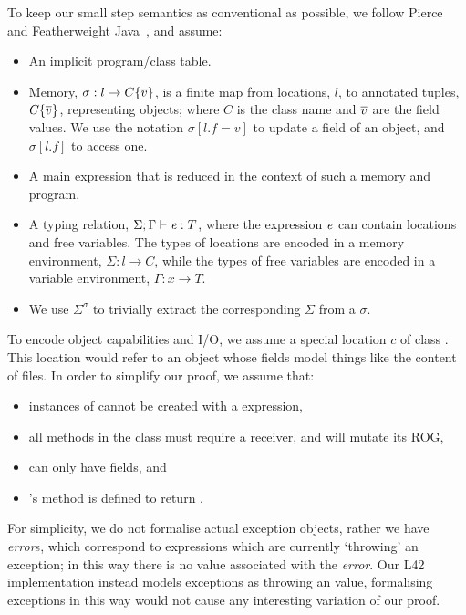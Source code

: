 To keep our small step semantics as conventional as possible, we follow Pierce~\cite{pierce2002types} and Featherweight Java~\cite{IgarashiEtAl01}, and assume:
\begin{itemize}
	\item An implicit program/class table.
	\item Memory, $\sigma : l\rightarrow C\{\hspace{0.03ex} \overline{\hspace{-0.03ex}v\hspace{-0.03ex}} \hspace{0.03ex}\}${, is} a finite map from locations, $l$, to annotated tuples, $C\{\hspace{0.03ex} \overline{\hspace{-0.03ex}v\hspace{-0.03ex}} \hspace{0.03ex}\}$, representing objects; where $C$ is the class name and $\hspace{0.03ex} \overline{\hspace{-0.03ex}v\hspace{-0.03ex}} \hspace{0.03ex}$ are the field values.
	We use the notation $\sigma[l.f=v]$ to update a field of an object, and $\sigma[l.f]$ to access one.
	\item A main expression that is reduced in the context of such a memory and program.
	\item A typing relation, $\Sigma;\Gamma\vdash{\ensuremath{\mathit{e}}}:T$, where 
	the expression ${\mathit{e}}$ can contain locations and free variables. The types of locations are encoded in 
a memory environment, 
$\Sigma : l\rightarrow C$,
	while the types of free variables are encoded in
a variable environment, $\Gamma : x\rightarrow T$.
	\item We use $\Sigma^\sigma$ to trivially extract the corresponding $\Sigma$ from a $\sigma$.
\end{itemize}
To encode object capabilities and I/O, we assume a special location  $c$ of class \Q@Cap@. This location would refer to an object whose fields model things like the content of files. In order to simplify our proof, we assume that:
\begin{itemize}
	\item instances of \Q@Cap@ cannot be created with a \Q@new@ expression,
	\item all methods in the \Q@Cap@ class must require a \Q@mut@ receiver, and will mutate its ROG,
	\item \Q@Cap@ can only have \Q@mut@ fields, and
	\item \Q@Cap@'s \Q@invariant@ method is defined to return \Q@true@.
\end{itemize}
For simplicity, we do not formalise actual exception objects, rather we have \emph{error}s, which correspond to expressions which are currently  `throwing' an exception; 
in this way there is no value associated with the \emph{error}.
Our L42 implementation instead models exceptions as throwing an \Q@imm@ value, formalising exceptions in this way would not cause any interesting variation of our proof.

